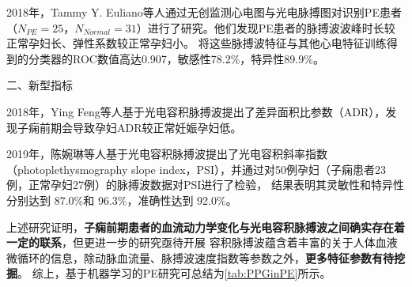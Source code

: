 2018年，Tammy Y. Euliano等人\cite{Euliano2018}通过无创监测心电图与光电脉搏图对识别PE患者（$N_{PE}=25$，$N_{Normal}=31$）进行了研究。他们发现PE患者的脉搏波波峰时长较正常孕妇长、弹性系数较正常孕妇小。
将这些脉搏波特征与其他心电特征训练得到的分类器的ROC数值高达0.907，敏感性78.2\%，特异性89.9\%。

二、新型指标

2018年，Ying Feng等人\cite{Feng2018}基于光电容积脉搏波提出了差异面积比参数（ADR），发现子痫前期会导致孕妇ADR较正常妊娠孕妇低。

2019年，陈婉琳等人\cite{Chen2019}基于光电容积脉搏波提出了光电容积斜率指数（photoplethysmography slope index，PSI），并通过对50例孕妇（子痫患者23例，正常孕妇27例）的脉搏波数据对PSI进行了检验，
结果表明其灵敏性和特异性分别达到 87.0\%和 96.3\%，准确性达到 92.0\%。

上述研究证明，\textbf{子痫前期患者的血流动力学变化与光电容积脉搏波之间确实存在着一定的联系}，但更进一步的研究亟待开展
容积脉搏波蕴含着丰富的关于人体血液微循环的信息，除动脉血流量、脉搏波速度指数等参数之外，\textbf{更多特征参数有待挖掘}。
综上，基于机器学习的PE研究可总结为\autoref{tab:PPGinPE}所示。

